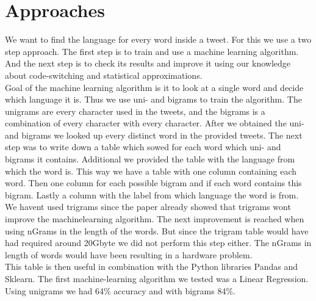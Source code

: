 \section{Approaches}\label{sec:Approaches}
We want to find the language for every word inside a tweet. For this we use a two step approach. The first step is to train and use a machine learning algorithm. And the next step is to check its results and improve it using our knowledge about code-switching and statistical approximations. \\
Goal of the machine learning algorithm is it to look at a single word and decide which language it is. Thus we use uni- and bigrams to train the algorithm. The unigrams are every character used in the tweets, and the bigrams is a combination of every character with every character. After we obtained the uni- and bigrams we looked up every distinct word in the provided tweets. The next step was to write down a table which sowed for each word which uni- and bigrams it contains. Additional we provided the table with the language from which the word is. This way we have a table with one column containing each word. Then one column for each possible bigram and if each word contains this bigram. Lastly a column with the label from which language the word is from. We havent used trigrams since the paper \cite{multipleLanguages} already showed that trigrams wont improve the machinelearning algorithm. The next improvement is reached when using nGrams in the length of the words. But since the trigram table would have had required around 20Gbyte we did not perform this step either. The nGrams in length of words would have been resulting in a hardware problem.\\
This table is then useful in combination with the Python libraries Pandas and Sklearn.
The first machine-learning algorithm we tested was a Linear Regression. Using unigrams we had 64\% accuracy and with bigrams 84\%.  \\